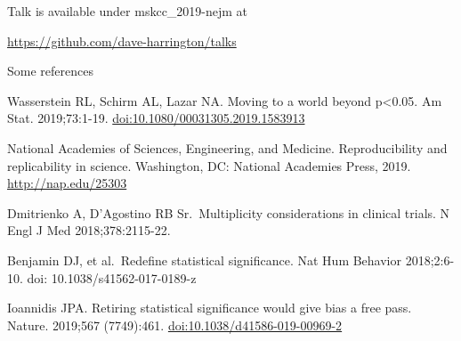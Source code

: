 \documentclass[ignorenonframetext,]{beamer}
\begin{document}
\begin{frame}

Talk is available under mskcc\_2019-nejm at

\url{https://github.com/dave-harrington/talks}

\end{frame}

\begin{frame}{Some references}
\protect\hypertarget{some-references}{}

\small

Wasserstein RL, Schirm AL, Lazar NA. Moving to a world beyond
p\textless{}0.05. Am Stat. 2019;73:1-19.
\url{doi:10.1080/00031305.2019.1583913}

National Academies of Sciences, Engineering, and Medicine.
Reproducibility and replicability in science. Washington, DC: National
Academies Press, 2019. \url{http://nap.edu/25303}

Dmitrienko A, D'Agostino RB Sr.~Multiplicity considerations in clinical
trials. N Engl J Med 2018;378:2115-22.

Benjamin DJ, et al.~Redefine statistical significance. Nat Hum Behavior
2018;2:6-10. doi: 10.1038/s41562-017-0189-z

Ioannidis JPA. Retiring statistical significance would give bias a free
pass. Nature. 2019;567 (7749):461. \url{doi:10.1038/d41586-019-00969-2}

\end{frame}
\end{document}
